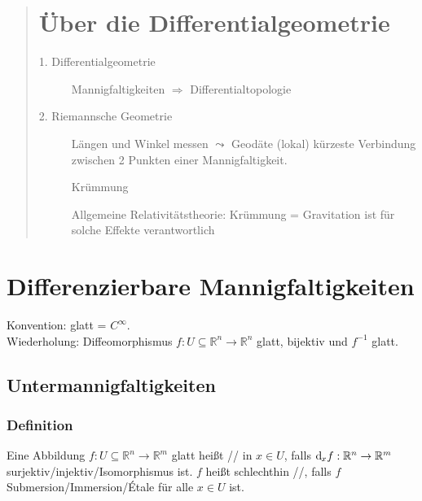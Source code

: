 
\newcommand{\fach}{Differentialgeometrie \RM{1}.}
\newcommand{\semester}{WiSe 2014}
\newcommand{\homepage}{https://wwwmath.uni-muenster.de/u/frederik.witt/diffgeoI.html}
\newcommand{\prof}{Frederik Witt}
\newcommand{\verfasser}{Arne Grauer}




\maketitle
\begin{abstract}

\section*{Über die Differentialgeometrie}
\begin{description}
	\item[1. Differentialgeometrie] Mannigfaltigkeiten $\Rightarrow $ Differentialtopologie
	\item[2. Riemannsche Geometrie] Längen und Winkel messen $\leadsto$ Geodäte (lokal) kürzeste Verbindung zwischen 2 Punkten einer Mannigfaltigkeit.
	
	Krümmung
	
	Allgemeine Relativitätstheorie: Krümmung = Gravitation ist für solche Effekte verantwortlich
\end{description}
\end{abstract}

\tableofcontents
\cleardoubleoddemptypage
{}
\setcounter{page}{1}


\section{Differenzierbare Mannigfaltigkeiten} %
\label{sec:1}
Konvention: glatt = $C^\infty$.\\
Wiederholung: Diffeomorphismus $f : U \subseteq \mathds{R}^n \to \mathds{R}^n$ glatt, bijektiv und $f ^{-1}$ glatt.

\subsection{Untermannigfaltigkeiten} %
\label{sub:11}

\subsubsection[Definition: Submersion, Immersion und Étale]{Definition} %
\label{ssub:11}
Eine Abbildung $f : U \subseteq \mathds{R}^n \to \mathds{R}^m$ glatt heißt // in $x \in U$, falls
$\mathrm{d}\mkern-1.0mu_x f : \mathbb{R}^n \to \mathbb{R}^m$ surjektiv/injektiv/Isomorphismus ist. $f$ heißt schlechthin
//, falls $f$ Submersion/Immersion/Étale für alle $x \in U$ ist.

